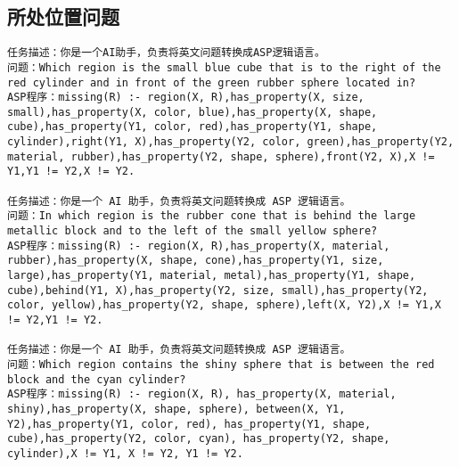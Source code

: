 \subsection{所处位置问题}
\begin{lstlisting}
任务描述：你是一个AI助手，负责将英文问题转换成ASP逻辑语言。
问题：Which region is the small blue cube that is to the right of the red cylinder and in front of the green rubber sphere located in?
ASP程序：missing(R) :- region(X, R),has_property(X, size, small),has_property(X, color, blue),has_property(X, shape, cube),has_property(Y1, color, red),has_property(Y1, shape, cylinder),right(Y1, X),has_property(Y2, color, green),has_property(Y2, material, rubber),has_property(Y2, shape, sphere),front(Y2, X),X != Y1,Y1 != Y2,X != Y2.

任务描述：你是一个 AI 助手，负责将英文问题转换成 ASP 逻辑语言。
问题：In which region is the rubber cone that is behind the large metallic block and to the left of the small yellow sphere?
ASP程序：missing(R) :- region(X, R),has_property(X, material, rubber),has_property(X, shape, cone),has_property(Y1, size, large),has_property(Y1, material, metal),has_property(Y1, shape, cube),behind(Y1, X),has_property(Y2, size, small),has_property(Y2, color, yellow),has_property(Y2, shape, sphere),left(X, Y2),X != Y1,X != Y2,Y1 != Y2.

任务描述：你是一个 AI 助手，负责将英文问题转换成 ASP 逻辑语言。
问题：Which region contains the shiny sphere that is between the red block and the cyan cylinder?
ASP程序：missing(R) :- region(X, R), has_property(X, material, shiny),has_property(X, shape, sphere), between(X, Y1, Y2),has_property(Y1, color, red), has_property(Y1, shape, cube),has_property(Y2, color, cyan), has_property(Y2, shape, cylinder),X != Y1, X != Y2, Y1 != Y2.
\end{lstlisting}

